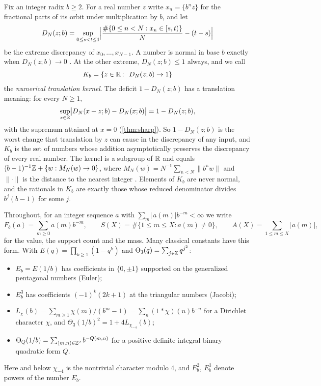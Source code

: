 \documentclass[11pt]{article}
\newcommand{\dist}[1]{\lVert #1\rVert}
\newcommand{\fr}[1]{\{#1\}}
\newcommand{\cnt}{\#}
\begin{document}
Fix an integer radix $b\ge2$. For a real number $z$ write $x_n=\fr{b^nz}$ for
the fractional parts of its orbit under multiplication by $b$, and let
\[
D_N(z;b)=\sup_{0\le s<t\le1}\Bigl|\frac{\cnt\{0\le n<N:x_n\in[s,t)\}}{N}-(t-s)\Bigr|
\]
be the extreme discrepancy of $x_0,\dots,x_{N-1}$. A number is normal in base $b$
exactly when $D_N(z;b)\to0$ \cite{KN}. At the other extreme, $D_N(z;b)\le1$
always, and we call
\[
K_b=\{z\in\R:\ D_N(z;b)\to1\}
\]
the \emph{numerical translation kernel}. The deficit $1-D_N(z;b)$ has a
translation meaning: for every $N\ge1$,
\begin{equation}\label{eq:sharp}
\sup_{x\in\mathbb R}\bigl|D_N(x+z;b)-D_N(x;b)\bigr|=1-D_N(z;b),
\end{equation}
with the supremum attained at $x=0$ (\cref{thm:sharp}). So $1-D_N(z;b)$ is the
worst change that translation by $z$ can cause in the discrepancy of any input,
and $K_b$ is the set of numbers whose addition asymptotically preserves the
discrepancy of every real number. The kernel is a subgroup of $\mathbb R$ and equals
$(b-1)^{-1}\mathbb Z+\{w:M_N(w)\to0\}$, where $M_N(w)=N^{-1}\sum_{n<N}\dist{b^nw}$ and
$\dist{\cdot}$ is the distance to the nearest integer \cite{DiscrepancyCompanion}.
Elements of $K_b$ are never normal, and the rationals in $K_b$ are exactly those
whose reduced denominator divides $b^j(b-1)$ for some $j$.

Throughout, for an integer sequence $a$ with $\sum_m|a(m)|b^{-m}<\infty$ we write
\[
F_b(a)=\sum_{m\ge0}a(m)b^{-m},\qquad S(X)=\cnt\{1\le m\le X:a(m)\ne0\},\qquad
A(X)=\sum_{1\le m\le X}|a(m)|,
\]
for the value, the support count and the mass. Many classical constants have
this form. With $E(q)=\prod_{k\ge1}(1-q^k)$ and $\Theta_3(q)=\sum_{j\in\mathbb Z}q^{j^2}$:
\begin{itemize}[nosep]
\item $E_b=E(1/b)$ has coefficients in $\{0,\pm1\}$ supported on the generalized
pentagonal numbers (Euler);
\item $E_b^3$ has coefficients $(-1)^k(2k+1)$ at the triangular numbers (Jacobi);
\item $L_\chi(b)=\sum_{m\ge1}\chi(m)/(b^m-1)=\sum_n(1*\chi)(n)b^{-n}$ for a
Dirichlet character $\chi$, and $\Theta_3(1/b)^2=1+4L_{\chi_{-4}}(b)$;
\item $\Theta_Q(1/b)=\sum_{(m,n)\in\mathbb Z^2}b^{-Q(m,n)}$ for a positive definite
integral binary quadratic form $Q$.
\end{itemize}
Here and below $\chi_{-4}$ is the nontrivial character modulo $4$, and $E_b^2$,
$E_b^3$ denote powers of the number $E_b$.
\end{document}
